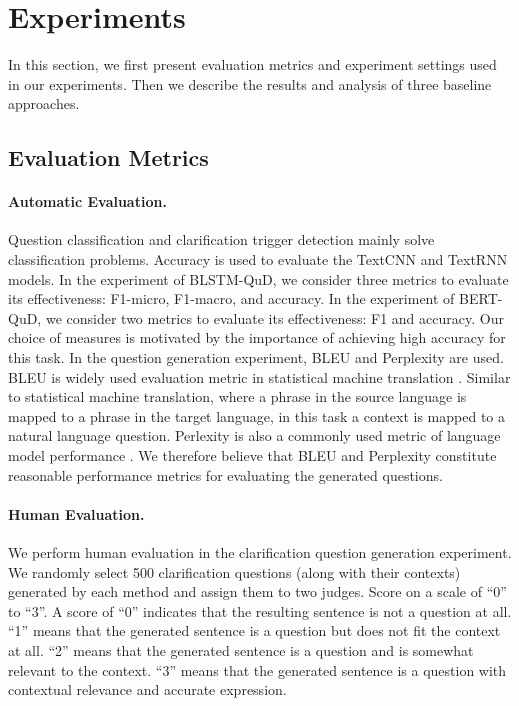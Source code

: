 \section{Experiments}
\label{experiments}

In this section, we first present evaluation metrics and experiment settings used in our experiments. Then we describe the results and analysis of three baseline approaches.

\subsection{Evaluation Metrics}
\paragraph{Automatic Evaluation.} 
Question classification and clarification trigger detection mainly solve classification problems. Accuracy is used to evaluate the TextCNN and TextRNN models. In the experiment of BLSTM-QuD, we consider three metrics to evaluate its effectiveness: F1-micro, F1-macro, and accuracy. In the experiment of BERT-QuD, we consider two metrics to evaluate its effectiveness: F1 and accuracy. Our choice of measures is motivated by the importance of achieving high accuracy for this task. In the question generation experiment, BLEU and Perplexity are used. BLEU \cite{DBLP:conf/acl/PapineniRWZ02} is widely used evaluation metric in statistical machine translation \cite{DBLP:journals/corr/ChenFLVGDZ15}. Similar to statistical machine translation, where a phrase in the source language is mapped to a phrase in the target language, in this task a context is mapped to a natural language question. Perlexity is also a commonly used metric of language model performance \cite{DBLP:journals/corr/abs-2006-04666}. We therefore believe that BLEU and Perplexity constitute reasonable performance metrics for evaluating the generated questions.

\paragraph{Human Evaluation.} 
We perform human evaluation in the clarification question generation experiment. 
We randomly select 500 clarification questions (along with their contexts)
generated by each method and assign them to two judges. 
Score on a scale of ``0'' to ``3''. A score of ``0'' indicates that the resulting sentence is 
not a question at all. ``1'' means that the generated sentence is a question but does not fit the
context at all. ``2'' means that the generated sentence is a question and is somewhat relevant
to the context. ``3'' means that the generated sentence is a question with contextual relevance and accurate expression.


